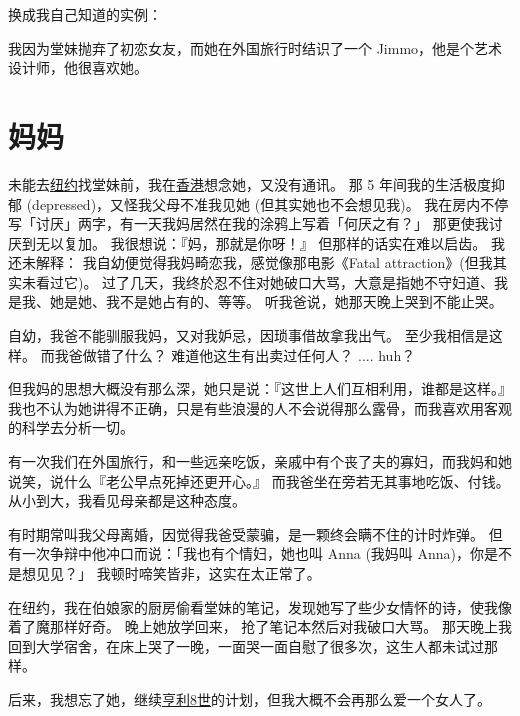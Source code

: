 \documentclass[12pt]{report}
\begin{document}
换成我自己知道的实例：
\begin{center}
\end{center}
我因为堂妹抛弃了初恋女友，而她在外国旅行时结识了一个 Jimmo，他是个艺术设计师，他很喜欢她。

\chapter{妈妈}

未能去\uline{纽约}找堂妹前，我在\uline{香港}想念她，又没有通讯。 那 5 年间我的生活极度抑郁 (depressed)，又怪我父母不准我见她 (但其实她也不会想见我)。 我在房内不停写「讨厌」两字，有一天我妈居然在我的涂鸦上写着「何厌之有？」 那更使我讨厌到无以复加。 我很想说：『妈，那就是你呀！』 但那样的话实在难以启齿。 我还未解释： 我自幼便觉得我妈畸恋我，感觉像那电影《Fatal attraction》(但我其实未看过它)。 过了几天，我终於忍不住对她破口大骂，大意是指她不守妇道、我是我、她是她、我不是她占有的、等等。 听我爸说，她那天晚上哭到不能止哭。

自幼，我爸不能驯服我妈，又对我妒忌，因琐事借故拿我出气。 至少我相信是这样。 而我爸做错了什么？ 难道他这生有出卖过任何人？ .... huh？

但我妈的思想大概没有那么深，她只是说：『这世上人们互相利用，谁都是这样。』 我也不认为她讲得不正确，只是有些浪漫的人不会说得那么露骨，而我喜欢用客观的科学去分析一切。

有一次我们在外国旅行，和一些远亲吃饭，亲戚中有个丧了夫的寡妇，而我妈和她说笑，说什么『老公早点死掉还更开心。』 而我爸坐在旁若无其事地吃饭、付钱。 从小到大，我看见母亲都是这种态度。

有时期常叫我父母离婚，因觉得我爸受蒙骗，是一颗终会瞒不住的计时炸弹。 但有一次争辩中他冲口而说：「我也有个情妇，她也叫 Anna (我妈叫 Anna)，你是不是想见见？」 我顿时啼笑皆非，这实在太正常了。

在纽约，我在伯娘家的厨房偷看堂妹的笔记，发现她写了些少女情怀的诗，使我像着了魔那样好奇。 晚上她放学回来， 抢了笔记本然后对我破口大骂。 那天晚上我回到大学宿舍，在床上哭了一晚，一面哭一面自慰了很多次，这生人都未试过那样。

后来，我想忘了她，继续\uline{亨利8世}的计划，但我大概不会再那么爱一个女人了。
\end{document}
